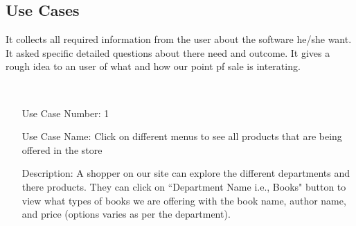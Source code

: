 \documentclass[10pt,conference,onecolumn,compsoc]{IEEEtran}
\begin{document}
\subsection{Use Cases}
It collects all required information from the user about the software he/she want. It asked specific detailed questions about there need and outcome. It gives a rough idea to an user of what and how our point pf sale is interating.

\begin{table}[!htb]
\centering
{}\\
\caption{Point of Sale Use Case Table}
\label{tab:useCaseIndex}
\end{table}



\begin{itemize}
\item[Use Case Number:] 1
\item[Use Case Name:] Click on different menus to see all products that are being offered in the store
\item[Description:] A shopper on our site can explore the different departments and there products. They can click on ``Department Name i.e., Books" button to view what types of books we are offering with the book name, author name, and price (options varies as per the department). 
\end{itemize}
\end{document}

